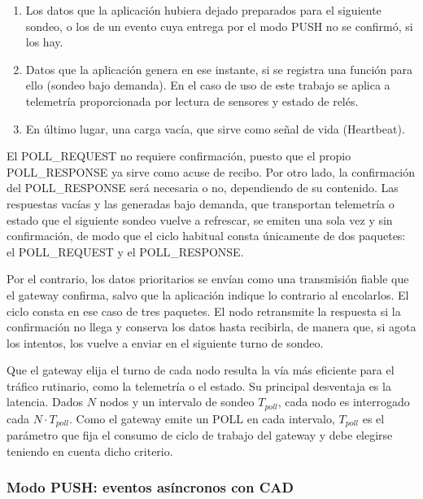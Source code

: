 \begin{enumerate}
    
\item Los datos que la aplicación hubiera dejado preparados para el siguiente sondeo, o los de un evento cuya entrega por el modo PUSH no se confirmó, si los hay.

\item Datos que la aplicación genera en ese instante, si se registra una función para ello (sondeo bajo demanda). En el caso de uso de este trabajo se aplica a telemetría proporcionada por lectura de sensores y estado de relés.

\item En último lugar, una carga vacía, que sirve como señal de vida (Heartbeat).

\end{enumerate}

El POLL\_REQUEST no requiere confirmación, puesto que el propio POLL\_RESPONSE ya sirve como acuse de recibo. Por otro lado, la confirmación del POLL\_RESPONSE será necesaria o no, dependiendo de su contenido. Las respuestas vacías y las generadas bajo demanda, que transportan telemetría o estado que el siguiente sondeo vuelve a refrescar, se emiten una sola vez y sin confirmación, de modo que el ciclo habitual consta únicamente de dos paquetes: el POLL\_REQUEST y el POLL\_RESPONSE.

Por el contrario, los datos prioritarios se envían como una transmisión fiable que el gateway confirma, salvo que la aplicación indique lo contrario al encolarlos. El ciclo consta en ese caso de tres paquetes. El nodo retransmite la respuesta si la confirmación no llega y conserva los datos hasta recibirla, de manera que, si agota los intentos, los vuelve a enviar en el siguiente turno de sondeo.

Que el gateway elija el turno de cada nodo resulta la vía más eficiente para el tráfico rutinario, como la telemetría o el estado. Su principal desventaja es la latencia. Dados $N$ nodos y un intervalo de sondeo $T_{poll}$, cada nodo es interrogado cada $N \cdot T_{poll}$. Como el gateway emite un POLL en cada intervalo, $T_{poll}$ es el parámetro que fija el consumo de ciclo de trabajo del gateway y debe elegirse teniendo en cuenta dicho criterio.


\subsubsection{Modo PUSH: eventos asíncronos con CAD}

